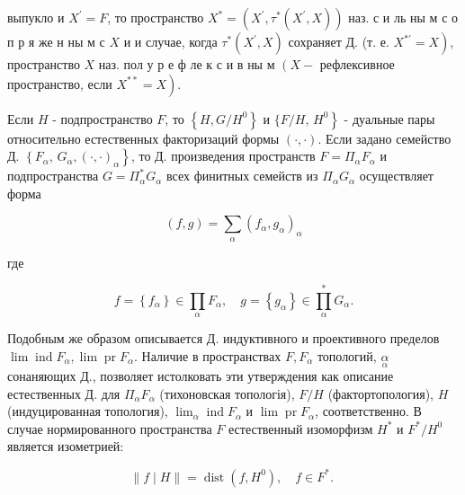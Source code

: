 \documentclass[10pt]{article}
\begin{document}
выпукло и $X^{\prime}=F$, то пространство $X^{*}=\left(X^{\prime}, \tau^{*}\left(X^{\prime}, X\right)\right)$ наз. с и ль ны м с о п р я же н ны м с $X$ и и случае, когда $\tau^{*}\left(X^{\prime}, X\right)$ сохраняет Д. (т. е. $\left.X^{* \prime}=X\right)$, пространство $X$ наз. пол у р е ф ле к с и в ны м $\left(X-\right.$ рефлексивное пространство, если $\left.X^{* *}=X\right)$.



Если $H$ - подпространство $F$, то $\left\{H, G / H^{0}\right\}$ и $\{F / H$, $\left.H^{0}\right\}$ - дуальные пары относительно естественных факторизаций формы $(\cdot, \cdot)$. Если задано семейство Д. $\left\{F_{\alpha}\right.$, $\left.G_{\alpha},(\cdot, \cdot)_{\alpha}\right\}$, то Д. произведения пространств $F=\Pi_{\alpha} F_{\alpha}$ и подпространства $G=\Pi_{\alpha}^{*} G_{\alpha}$ всех финитных семейств из $\Pi_{\alpha} G_{\alpha}$ осуществляет форма



\[

(f, g)=\sum_{\alpha}\left(f_{\alpha}, g_{\alpha}\right)_{\alpha}

\]



где



\[

f=\left\{f_{\alpha}\right\} \in \prod_{\alpha} F_{\alpha}, \quad g=\left\{g_{\alpha}\right\} \in \prod_{\alpha}^{*} G_{\alpha} .

\]



Подобным же образом описывается Д. индуктивного и проективного пределов $\lim \operatorname{ind} F_{\alpha}, \lim \operatorname{pr} F_{\alpha}$. Наличие в пространствах $F, F_{\alpha}$ топологий, $\underset{\alpha}{\alpha}$ сонаняющих Д., позволяет истолковать эти утверждения как описание естественных Д. для $\Pi_{\alpha} F_{\alpha}$ (тихоновская топологія), $F / H$ (фактортопология), $H$ (индуцированная топология), $\lim _{\alpha} \operatorname{ind} F_{\alpha}$ и $\lim \operatorname{pr} F_{\alpha}$, соответственно. В случае нормированного пространства $F$ естественный изоморфизм $H^{*}$ и $F^{*} / H^{0}$ является изометрией:



\[

\|f \mid H\|=\operatorname{dist}\left(f, H^{0}\right), \quad f \in F^{*} \text {. }

\]
\end{document}
